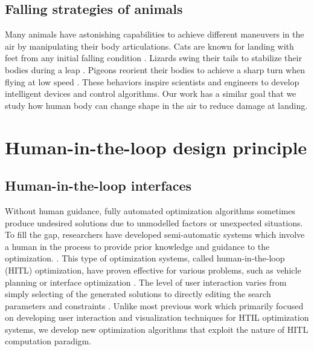 \subsection{Falling strategies of animals}
Many animals have astonishing capabilities to achieve different
maneuvers in the air by manipulating their body articulations.  Cats
are known for landing with feet from any initial falling condition
\cite{Kane:1969:DEF,Montgomery:1993:GTF}. Lizards swing their tails to
stabilize their bodies during a leap \cite{Libby:2012:TAP}. Pigeons
reorient their bodies to achieve a sharp turn when flying at low speed
\cite{Ros:2011:PSL}. These behaviors inspire scientists and engineers
to develop intelligent devices and control algorithms. Our work has a
similar goal that we study how human body can change shape in the
air to reduce damage at landing.

\section{Human-in-the-loop design principle}
\label{sec:related_hitl}

\subsection{Human-in-the-loop interfaces}
Without human guidance, fully automated optimization algorithms
sometimes produce undesired solutions due to unmodelled factors or
unexpected situations. To fill the gap, researchers have developed
semi-automatic systems which involve a human in the process to provide
prior knowledge and guidance to the
optimization.
\cite{Scott:2002:IHC}. 
This type of optimization systems, called human-in-the-loop (HITL)
optimization, have proven effective for various problems, such as
vehicle planning
\cite{Waters:1984:IVR} or interface optimization
\cite{Quiroz:2007:IEX}.  The level of user interaction
varies from simply selecting of the generated solutions
\cite{Sims:1991:AEC} to directly editing the search parameters and
constraints \cite{Sreevalsan-Nair:2007:HGE}. Unlike
most previous work which primarily focused on developing user
interaction and visualization techniques for HTIL optimization
systems, we develop new optimization algorithms that exploit the nature of
HITL computation paradigm.


